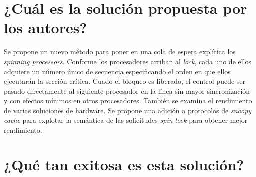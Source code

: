 \section{¿Cuál es la solución propuesta por los autores?}
Se propone un nuevo método para poner en una cola de espera explítica los \textit{spinning processors}. Conforme los procesadores arriban al \textit{lock}, cada uno de ellos adquiere un número único de secuencia especificando el orden en que ellos ejecutarán la sección crítica. Cuado el bloqueo es liberado, el control puede ser pasado directamente al siguiente procesador en la línea sin mayor sincronización y con efectos mínimos en otros procesadores. También se examina el rendimiento de varias soluciones de hardware. Se propone una adición a protocolos de \textit{snoopy cache} para explotar la semántica de las solicitudes \textit{spin lock} para obtener mejor rendimiento.




\section{¿Qué tan exitosa es esta solución?} 